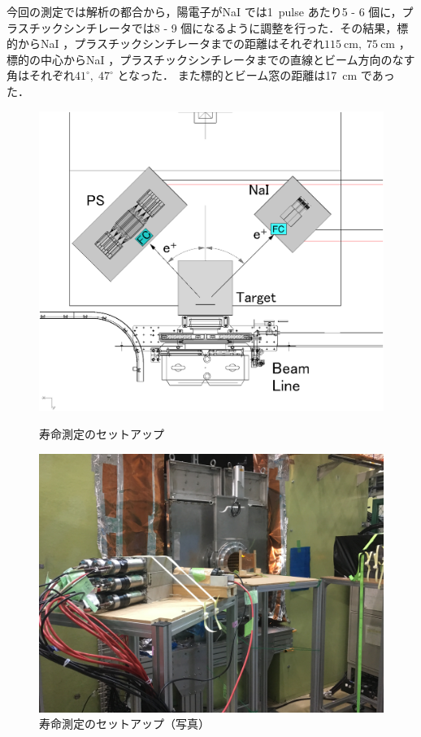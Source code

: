 今回の測定では解析の都合から，陽電子がNaI では1~pulse あたり5 - 6 個に，プラスチックシンチレータでは8 - 9 個になるように調整を行った．その結果，標的からNaI ，プラスチックシンチレータまでの距離はそれぞれ$115~\mathrm{cm}, \; 75~\mathrm{cm}$ ，標的の中心からNaI ，プラスチックシンチレータまでの直線とビーム方向のなす角はそれぞれ$41^{\circ}, \;  47^{\circ}$ となった．
また標的とビーム窓の距離は17~cm であった．
\begin{figure}[H]
\begin{minipage}{0.45\hsize}
\centering
\includegraphics[width=1\textwidth]{figure/tajima/set_lifetime.png}
\caption{寿命測定のセットアップ}
\label{set_life}
\end{minipage}
\begin{minipage}{0.45\hsize}
\centering
\includegraphics[width=1\textwidth]{figure/tajima/set_lifetime_1.png}
\caption{寿命測定のセットアップ（写真）}
\label{set_life2}
\end{minipage}
\end{figure}

